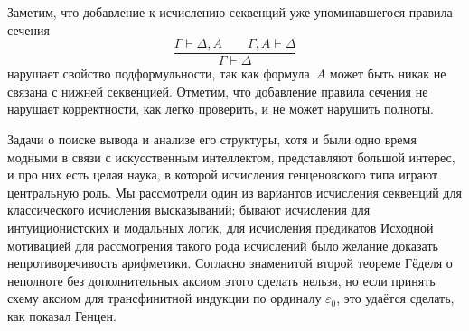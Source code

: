 Заметим, что добавление к исчислению секвенций уже упоминавшегося
правила сечения
        $$
\frac{\Gamma\vdash \Delta,A \qquad \Gamma, A\vdash \Delta}
     {\Gamma \vdash \Delta}
        $$
нарушает свойство  подформульности, так как формула~$A$
может быть никак не связана с нижней секвенцией. Отметим, что
добавление правила сечения не нарушает корректности, как легко
проверить, и не может нарушить полноты.

Задачи о поиске вывода и анализе его структуры, хотя и были одно
время модными в связи с  искусственным интеллектом,
представляют большой интерес, и про них есть целая наука, в
которой исчисления генценовского типа играют центральную роль.
Мы рассмотрели один из вариантов исчисления секвенций для
классического исчисления высказываний; бывают исчисления для
интуиционистских и модальных логик, для исчисления предикатов
 Исходной мотивацией для рассмотрения такого рода исчислений
было желание доказать непротиворечивость арифметики. Согласно
знаменитой
второй теореме Гёделя%
о неполноте%
без дополнительных аксиом
этого сделать нельзя, но если принять схему аксиом для
трансфинитной индукции по ординалу $\varepsilon_0$, это удаётся
сделать, как показал Генцен.%
